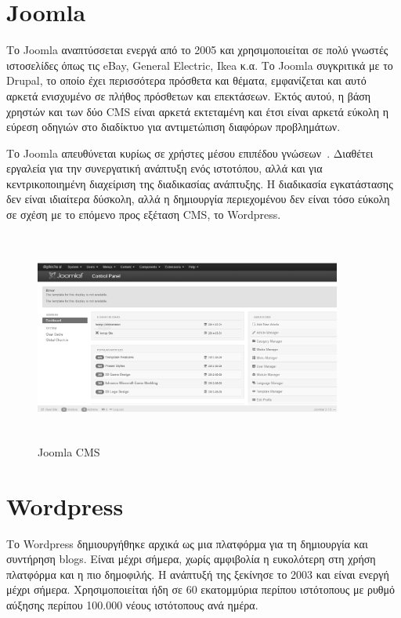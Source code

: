 \documentclass[12pt]{report}
\begin{document}
\section{\textlatin{Joomla}}
Το \textlatin{Joomla} αναπτύσσεται ενεργά από το 2005 και χρησιμοποιείται σε πολύ γνωστές ιστοσελίδες όπως τις \textlatin{eBay, General Electric, Ikea} κ.α. Το \textlatin{Joomla} συγκριτικά με το \textlatin{Drupal}, το οποίο έχει περισσότερα πρόσθετα και θέματα, εμφανίζεται και αυτό αρκετά ενισχυμένο σε πλήθος πρόσθετων και επεκτάσεων. Εκτός αυτού, η βάση χρηστών και των δύο \textlatin{CMS} είναι αρκετά εκτεταμένη και έτσι είναι αρκετά εύκολη η εύρεση οδηγιών στο διαδίκτυο για αντιμετώπιση διαφόρων προβλημάτων.

Το \textlatin{Joomla} απευθύνεται κυρίως σε χρήστες μέσου επιπέδου γνώσεων~\cite{pixelmedia}. Διαθέτει εργαλεία για την συνεργατική ανάπτυξη ενός ιστοτόπου, αλλά και για κεντρικοποιημένη διαχείριση της διαδικασίας ανάπτυξης. Η διαδικασία εγκατάστασης δεν είναι ιδιαίτερα δύσκολη, αλλά η δημιουργία περιεχομένου δεν είναι τόσο εύκολη σε σχέση με το επόμενο προς εξέταση \textlatin{CMS}, το \textlatin{Wordpress}.
\begin{figure}[H]
\centering
\includegraphics[width=0.9\textwidth, height=7cm]{joomla-gray}
\caption{\textlatin{Joomla CMS}}
\label{fig:joomla}
\end{figure}

\section{\textlatin{Wordpress}}
Το \textlatin{Wordpress} δημιουργήθηκε αρχικά ως μια πλατφόρμα για τη δημιουργία και συντήρηση \textlatin{blogs}. Είναι μέχρι σήμερα, χωρίς αμφιβολία η ευκολότερη στη χρήση πλατφόρμα και η πιο δημοφιλής. Η ανάπτυξή της ξεκίνησε το 2003 και είναι ενεργή μέχρι σήμερα. Χρησιμοποιείται ήδη σε 60 εκατομμύρια περίπου ιστότοπους με ρυθμό αύξησης περίπου 100.000 νέους ιστότοπους ανά ημέρα.
\end{document}
